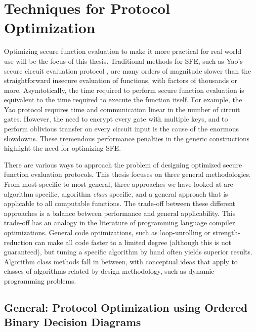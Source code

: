 
\chapter{Techniques for Protocol Optimization}

\label{sec:Techniques}

Optimizing secure function evaluation to make it more practical for
real world use will be the focus of this thesis. Traditional methods
for SFE, such as Yao's secure circuit evaluation protocol \cite{Yao86},
are many orders of magnitude slower than the straightforward insecure
evaluation of functions, with factors of thousands or more. Asymtotically,
the time required to perform secure function evaluation is equivalent
to the time required to execute the function itself. For example,
the Yao protocol requires time and communication linear in the number
of circuit gates. However, the need to encrypt every gate with multiple
keys, and to perform oblivious transfer on every circuit input is
the cause of the enormous slowdowns. These tremendous performance
penalties in the generic constructions highlight the need for optimizing
SFE.

There are various ways to approach the problem of designing optimized
secure function evaluation protocols. This thesis focuses on three
general methodologies. From most specific to most general, three approaches
we have looked at are algorithm specific, algorithm \emph{class} specific,
and a general approach that is applicable to all computable functions.
The trade-off between these different approaches is a balance between
performance and general applicability. This trade-off has an analogy
in the literature of programming language compiler optimizations.
General code optimizations, such as loop-unrolling or strength-reduction
can make all code faster to a limited degree (although this is not
guaranteed), but tuning a specific algorithm by hand often yields
superior results. Algorithm class methods fall in between, with conceptual
ideas that apply to classes of algorithms related by design methodology,
such as dynamic programming problems.


\section{General: Protocol Optimization using Ordered Binary Decision Diagrams}

\label{OBDD-section}

